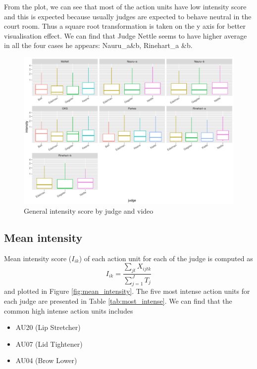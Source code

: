 \documentclass{monashthesis}
\begin{document}
From the plot, we can see that most of the action units have low intensity score and this is expected because usually judges are expected to behave neutral in the court room. Thus a square root transformation is taken on the y axis for better visualisation effect. We can find that Judge Nettle seems to have higher average in all the four cases he appears: Nauru\_a\&b, Rinehart\_a \&b.

\begin{figure}

{\centering \includegraphics[width=1\linewidth]{figures/unnamed-chunk-14-1} 

}

\caption{General intensity score by judge and video\label{fig:intensity}}\label{fig:unnamed-chunk-14}
\end{figure}

\hypertarget{mean-intensity}{%
\subsection{Mean intensity}\label{mean-intensity}}

Mean intensity score (\(I_{ik}\)) of each action unit for each of the judge is computed as \[I_{ik} = \frac{\sum_{jt}X_{ijtk}}{\sum_{j = 1}^JT_j}\] and plotted in Figure \ref{fig:mean_intensity}. The five most intense action units for each judge are presented in Table \ref{tab:most_intense}. We can find that the common high intense action units includes

\begin{itemize}
\tightlist
\item
  AU20 (Lip Stretcher)
\item
  AU07 (Lid Tightener)
\item
  AU04 (Brow Lower)
\end{itemize}
\end{document}
